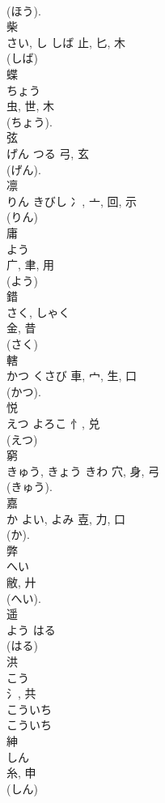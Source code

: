 \documentclass[8pt]{extreport}
\begin{document}
\begin{CJK}{UTF8}{min}
\\	(ほう). 
\\	柴	
\\	さい, し	しば	止, 匕, 木	
\\	(しば) 
\\	蝶	
\\	ちょう	
\\	虫, 世, 木	
\\	(ちょう).	
\\	弦	
\\	げん	つる	弓, 玄	
\\	(げん). 
\\	凛	
\\	りん	きびし	冫, 亠, 回, 示	
\\	(りん) 
\\	庸	
\\	よう	
\\	广, 聿, 用	
\\	(よう) 
\\	錯	
\\	さく, しゃく	
\\	金, 昔	
\\	(さく) 
\\	轄	
\\	かつ	くさび	車, 宀, 生, 口	
\\	(かつ). 
\\	悦	
\\	えつ	よろこ	忄, 兑	
\\	(えつ) 
\\	窮	
\\	きゅう, きょう	きわ	穴, 身, 弓	
\\	(きゅう). 
\\	嘉	
\\	か	よい, よみ	壴, 力, 口	
\\	(か). 
\\	弊	
\\	へい	
\\	敝, 廾	
\\	(へい). 
\\	遥	
\\	よう	はる		
\\	(はる) 
\\	洪	
\\	こう	
\\	氵, 共	
\\	こういち 
\\	こういち 
\\	紳	
\\	しん	
\\	糸, 申	
\\	(しん) 

\end{CJK}
\end{document}
